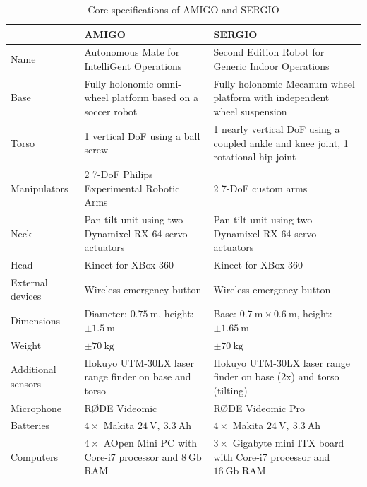 \begin{table}[H]
    \begin{center}
    \caption{Core specifications of AMIGO and SERGIO}
    \label{tab:hardwarespec}
    \renewcommand{\arraystretch}{1.0}
    \setlength{\tabcolsep}{5pt}
        \begin{tabular}{p{} p{} p{}}
            \toprule
            & AMIGO & SERGIO\\
            \midrule
            Name & Autonomous Mate for IntelliGent Operations & Second Edition Robot for Generic Indoor Operations \\
            Base & Fully holonomic omni-wheel platform based on a soccer robot & Fully holonomic Mecanum wheel platform with independent wheel suspension\\
            Torso & 1 vertical DoF using a ball screw & 1 nearly vertical DoF using a coupled ankle and knee joint, 1 rotational hip joint\\
            Manipulators & 2 7-DoF Philips Experimental Robotic Arms & 2 7-DoF custom arms \\
            Neck & Pan-tilt unit using two Dynamixel RX-64 servo actuators & Pan-tilt unit using two Dynamixel RX-64 servo actuators \\
            Head & Kinect for XBox 360 & Kinect for XBox 360 \\
            External devices & Wireless emergency button & Wireless emergency button \\
            Dimensions & Diameter: $0.75\ \mathrm{m}$, height: $\pm1.5\ \mathrm{m}$ & Base: $0.7\ \mathrm{m}\times0.6\ \mathrm{m}$, height: $\pm1.65\ \mathrm{m}$\\
            Weight & $\pm70\ \mathrm{kg}$ & $\pm70\ \mathrm{kg}$ \\
            Additional sensors & Hokuyo UTM-30LX laser range finder on base and torso & Hokuyo UTM-30LX laser range finder on base (2x) and torso (tilting) \\
            Microphone & R{\O}DE Videomic & R{\O}DE Videomic Pro\\
            Batteries & $4\times$ Makita $24\ \mathrm{V},\ 3.3\ \mathrm{Ah}$ & $4\times$ Makita $24\ \mathrm{V},\ 3.3\ \mathrm{Ah}$\\
            Computers & $4\times$ AOpen Mini PC with Core-i7 processor and $8\ \mathrm{Gb}$ RAM & $3\times$ Gigabyte mini ITX board with Core-i7 processor and 	$16\ \mathrm{Gb}$ RAM \\
            \bottomrule
        \end{tabular}
    \end{center}
\end{table}

